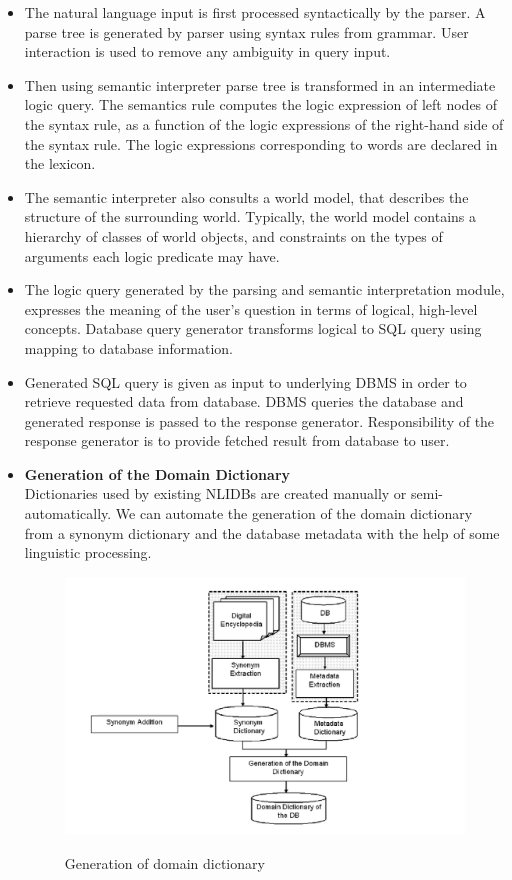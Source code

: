 \begin{itemize}
\item The natural language input is first processed syntactically by the parser. A parse tree is generated by parser using syntax rules from grammar. User interaction is used to remove any ambiguity in query input.

\item Then using semantic interpreter parse tree is transformed in an intermediate logic query. The semantics rule computes the logic expression of left nodes of the syntax rule, as a function of the logic expressions of the right-hand side of the syntax rule. The logic expressions corresponding to words are declared in the lexicon.\cite{two}

\item The semantic interpreter also consults a world model, that describes the structure of the surrounding world. Typically, the world model contains a hierarchy of classes of world objects, and constraints on the types of arguments each logic predicate may have.\cite{two}

\item The logic query generated by the parsing and semantic interpretation module, expresses the meaning of the user’s question in terms of logical, high-level concepts. Database query generator transforms logical to SQL query using mapping to database information.

\item Generated SQL query is given as input to underlying DBMS in order to retrieve requested data from database. DBMS queries the database and generated response is passed to the response generator. Responsibility of the response generator is to provide fetched result from database to user.

\item \textbf{Generation of the Domain Dictionary} \\
Dictionaries used by existing NLIDBs are created manually or semi-automatically. We can automate the generation of the domain dictionary from a synonym dictionary and the database metadata with the help of some linguistic processing.

\begin{figure}[ht]
\center
\includegraphics[width=1\columnwidth]{Dictionary}
\caption{Generation of domain dictionary}
\label{fig:Generation of domain dictionary}
\cite{five}
\end{figure}


\end{itemize}

